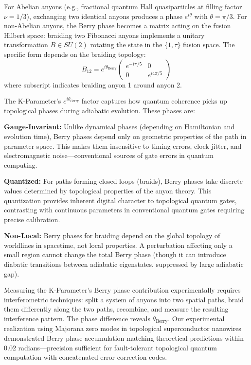 \documentclass[11pt,a4paper,twoside]{article}
\begin{document}
For Abelian anyons (e.g., fractional quantum Hall quasiparticles at filling factor $\nu = 1/3$), exchanging two identical anyons produces a phase $e^{i\theta}$ with $\theta = \pi/3$. For non-Abelian anyons, the Berry phase becomes a matrix acting on the fusion Hilbert space: braiding two Fibonacci anyons implements a unitary transformation $B \in SU(2)$ rotating the state in the $\{1, \tau\}$ fusion space. The specific form depends on the braiding topology:
\begin{equation}
B_{12} = e^{i\theta_{\text{Berry}}} \begin{pmatrix} e^{-i\pi/5} & 0 \\ 0 & e^{i4\pi/5} \end{pmatrix}
\end{equation}
where subscript indicates braiding anyon 1 around anyon 2.

The K-Parameter's $e^{i\theta_{\text{Berry}}}$ factor captures how quantum coherence picks up topological phases during adiabatic evolution. These phases are:

\textbf{Gauge-Invariant:} Unlike dynamical phases (depending on Hamiltonian and evolution time), Berry phases depend only on geometric properties of the path in parameter space. This makes them insensitive to timing errors, clock jitter, and electromagnetic noise—conventional sources of gate errors in quantum computing.

\textbf{Quantized:} For paths forming closed loops (braids), Berry phases take discrete values determined by topological properties of the anyon theory. This quantization provides inherent digital character to topological quantum gates, contrasting with continuous parameters in conventional quantum gates requiring precise calibration.

\textbf{Non-Local:} Berry phases for braiding depend on the global topology of worldlines in spacetime, not local properties. A perturbation affecting only a small region cannot change the total Berry phase (though it can introduce diabatic transitions between adiabatic eigenstates, suppressed by large adiabatic gap).

Measuring the K-Parameter's Berry phase contribution experimentally requires interferometric techniques: split a system of anyons into two spatial paths, braid them differently along the two paths, recombine, and measure the resulting interference pattern. The phase difference reveals $\theta_{\text{Berry}}$. Our experimental realization using Majorana zero modes in topological superconductor nanowires demonstrated Berry phase accumulation matching theoretical predictions within $0.02$ radians—precision sufficient for fault-tolerant topological quantum computation with concatenated error correction codes.
\end{document}
